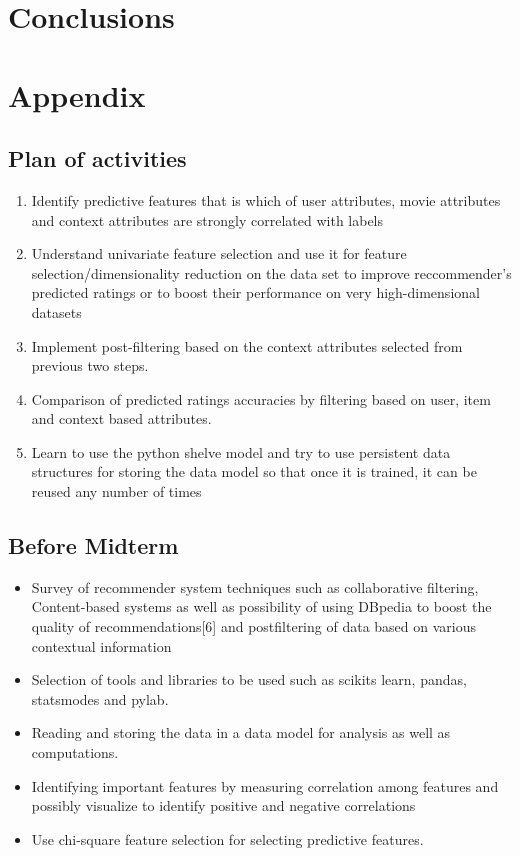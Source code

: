 \documentclass{article}
\begin{document}
\section{Conclusions}


\pagebreak

\section{Appendix}

\subsection{Plan of activities}

\begin{enumerate}
\item Identify predictive features that is which of user attributes, movie attributes and context attributes are strongly correlated with labels
\item Understand univariate feature selection and use it for feature selection/dimensionality reduction on the data set to improve reccommender's predicted ratings or to boost their performance on very high-dimensional datasets
\item Implement post-filtering based on the context attributes selected from previous two steps. 
\item Comparison of predicted ratings accuracies by filtering based on user, item and context based attributes. 
\item Learn to use the python shelve model and try to use persistent data structures for storing the data model so that once it is trained, it can be reused any number of times
\end{enumerate}

\subsection{Before Midterm}
\begin{itemize}
\item Survey of recommender system techniques such 
as collaborative filtering, Content-based systems 
as well as possibility of using DBpedia to boost 
the quality of recommendations[6] and postfiltering of data based on various contextual 
information
\item Selection of tools and libraries to be used such as 
scikits learn, pandas, statsmodes and pylab.
\item Reading and storing the data in a data model for analysis as well as computations.
\item Identifying important features by measuring 
correlation among features and possibly visualize 
to identify positive and negative correlations
\item Use chi-square feature selection for  selecting 
predictive features.
\end{itemize}



\end{document}

